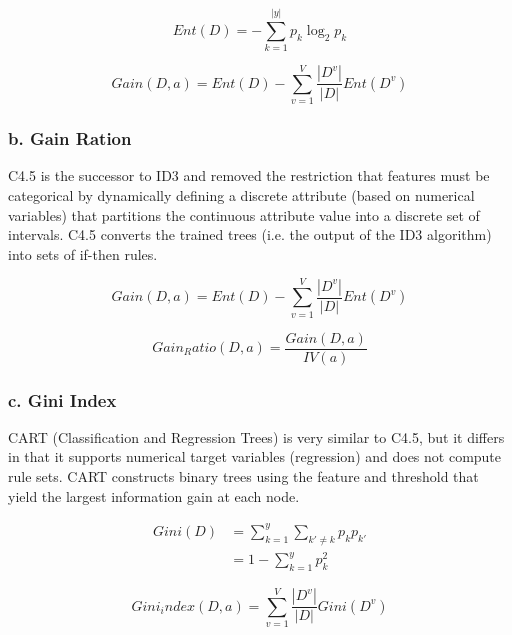 \documentclass[UTF8]{ctexart}
\begin{document}
\begin{equation}
	Ent(D) = -\sum_{k=1}^{|y|} p_k \log_2 p_k
\end{equation}

\begin{equation}
	Gain(D, a) = Ent(D) - \sum_{v=1}^{V} \frac{|D^v|}{|D|} Ent(D^v)
\end{equation}

\subsubsection*{b. Gain Ration}

C4.5 is the successor to ID3 and removed the restriction that features must be categorical by dynamically defining a discrete attribute (based on numerical variables) that partitions the continuous attribute value into a discrete set of intervals. C4.5 converts the trained trees (i.e. the output of the ID3 algorithm) into sets of if-then rules.

\begin{equation}
	Gain(D, a) = Ent(D) - \sum_{v=1}^{V} \frac{|D^v|}{|D|} Ent(D^v)
\end{equation}

\begin{equation}
	Gain_Ratio(D, a) = \frac{Gain(D, a)}{IV(a)}
\end{equation}

\subsubsection*{c. Gini Index}

CART (Classification and Regression Trees) is very similar to C4.5, but it differs in that it supports numerical target variables (regression) and does not compute rule sets. CART constructs binary trees using the feature and threshold that yield the largest information gain at each node.

\begin{equation}
	\begin{aligned}
		Gini(D) & = \sum_{k=1}^{y} \sum_{k'\neq k} p_k p_{k'} \\
		        & = 1 - \sum_{k=1}^{y} p_k^2
	\end{aligned}
\end{equation}

\begin{equation}
	Gini_index(D, a) = \sum_{v=1}^{V} \frac{|D^v|}{|D|} Gini(D^v)
\end{equation}
\end{document}

